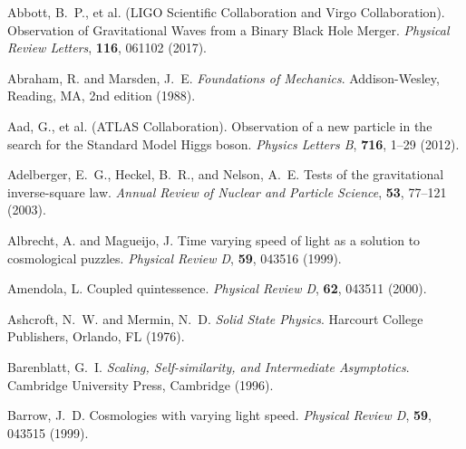 \documentclass[12pt,a4paper]{article}
\begin{document}
	
	
	\begin{thebibliography}{99}
		Abbott, B.~P., et al. (LIGO Scientific Collaboration and Virgo Collaboration).
		\newblock Observation of Gravitational Waves from a Binary Black Hole Merger.
		\newblock \textit{Physical Review Letters}, \textbf{116}, 061102 (2017).
		\newblock {}
		
		Abraham, R. and Marsden, J.~E.
		\newblock \textit{Foundations of Mechanics}.
		\newblock Addison-Wesley, Reading, MA, 2nd edition (1988).
		
		Aad, G., et al. (ATLAS Collaboration).
		\newblock Observation of a new particle in the search for the Standard Model Higgs boson.
		\newblock \textit{Physics Letters B}, \textbf{716}, 1--29 (2012).
		\newblock {}
		
		Adelberger, E.~G., Heckel, B.~R., and Nelson, A.~E.
		\newblock Tests of the gravitational inverse-square law.
		\newblock \textit{Annual Review of Nuclear and Particle Science}, \textbf{53}, 77--121 (2003).
		\newblock {}
		
		Albrecht, A. and Magueijo, J.
		\newblock Time varying speed of light as a solution to cosmological puzzles.
		\newblock \textit{Physical Review D}, \textbf{59}, 043516 (1999).
		\newblock {}
		
		Amendola, L.
		\newblock Coupled quintessence.
		\newblock \textit{Physical Review D}, \textbf{62}, 043511 (2000).
		\newblock {}
		
		Ashcroft, N.~W. and Mermin, N.~D.
		\newblock \textit{Solid State Physics}.
		\newblock Harcourt College Publishers, Orlando, FL (1976).
		
		Barenblatt, G.~I.
		\newblock \textit{Scaling, Self-similarity, and Intermediate Asymptotics}.
		\newblock Cambridge University Press, Cambridge (1996).
		
		Barrow, J.~D.
		\newblock Cosmologies with varying light speed.
		\newblock \textit{Physical Review D}, \textbf{59}, 043515 (1999).
		\newblock {}
		

\end{thebibliography}
\end{document}
